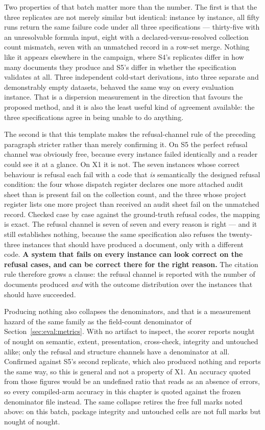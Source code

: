 Two properties of that batch matter more than the number. The first is that the three replicates
are not merely similar but identical: instance by instance, all fifty runs return the same failure
code under all three specifications --- thirty-five with an unresolvable formula input, eight with
a declared-versus-resolved collection count mismatch, seven with an unmatched record in a row-set
merge. Nothing like it appears elsewhere in the campaign, where S4's replicates differ in how many
documents they produce and S5's differ in whether the specification validates at all. Three
independent cold-start derivations, into three separate and demonstrably empty datasets, behaved
the same way on every evaluation instance. That is a dispersion measurement in the direction that
favours the proposed method, and it is also the least useful kind of agreement available: the
three specifications agree in being unable to do anything.

The second is that this template makes the refusal-channel rule of the preceding paragraph
stricter rather than merely confirming it. On S5 the perfect refusal channel was obviously free,
because every instance failed identically and a reader could see it at a glance. On X1 it is not.
The seven instances whose correct behaviour is refusal each fail with a code that \emph{is}
semantically the designed refusal condition: the four whose dispatch register declares one more
attached audit sheet than is present fail on the collection count, and the three whose project
register lists one more project than received an audit sheet fail on the unmatched record. Checked
case by case against the ground-truth refusal codes, the mapping is exact. The refusal channel is
seven of seven and every reason is right --- and it still establishes nothing, because the same
specification also refuses the twenty-three instances that should have produced a document, only
with a different code. \textbf{A system that fails on every instance can look correct on the
refusal cases, and can be correct there for the right reason.} The citation rule therefore grows a
clause: the refusal channel is reported with the number of documents produced \emph{and} with the
outcome distribution over the instances that should have succeeded.

Producing nothing also collapses the denominators, and that is a measurement hazard of the same
family as the field-count denominator of Section~\ref{sec:eval:metrics}. With no artifact to
inspect, the scorer reports nought of nought on semantic, extent, presentation, cross-check,
integrity and untouched alike; only the refusal and structure channels have a denominator at all.
Confirmed against S5's second replicate, which also produced nothing and reports the same way, so
this is general and not a property of X1. An accuracy quoted from those figures would be an
undefined ratio that reads as an absence of errors, so every compiled-arm accuracy in this chapter
is quoted against the frozen denominator file instead. The same collapse retires the free full
marks noted above: on this batch, package integrity and untouched cells are not full marks but
nought of nought.

